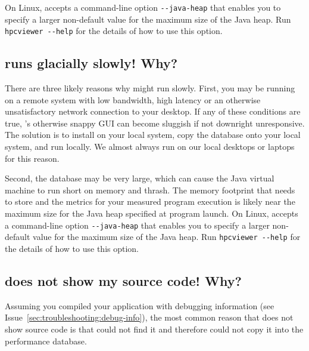 \documentclass[11pt,twoside,letterpaper]{report}
\begin{document}
On Linux, \hpcviewer{} accepts a command-line option \verb|--java-heap| that enables you to specify a larger non-default value for the maximum size of the Java heap. Run \verb|hpcviewer --help| for the details of how to use this option.



\subsection{\hpcviewer{} runs glacially slowly! Why?}

There are three likely reasons why \hpcviewer{} might run slowly.
First, you may be running \hpcviewer{} on a remote system with low bandwidth, high latency or an otherwise unsatisfactory network connection to your desktop.
If any of these conditions are true, \hpcviewer{}'s otherwise snappy GUI can become sluggish if not downright unresponsive.
The solution is to install \hpcviewer{} on your local system, copy the database onto your local system, and run \hpcviewer{} locally.
We almost always run \hpcviewer{} on our local desktops or laptops for this reason.

Second, the \HPCToolkit{} database may be very large, which can cause the Java virtual machine to run short on memory and thrash.
The memory footprint that \hpcviewer{} needs to store and the metrics for your measured program execution is likely near the maximum size for the Java heap specified at program launch.
On Linux, \hpcviewer{} accepts a command-line option \verb|--java-heap| that enables you to specify a larger non-default value for the maximum size of the Java heap. Run \verb|hpcviewer --help| for the details of how to use this option.



\subsection{\hpcviewer{} does not show my source code! Why?}


Assuming you compiled your application with debugging information (see Issue~\ref{sec:troubleshooting:debug-info}),
the most common reason that \hpcviewer{} does not show source code is that \hpcprofAll{}
could not find it and therefore could not copy it into the \HPCToolkit{} performance database.
\end{document}
